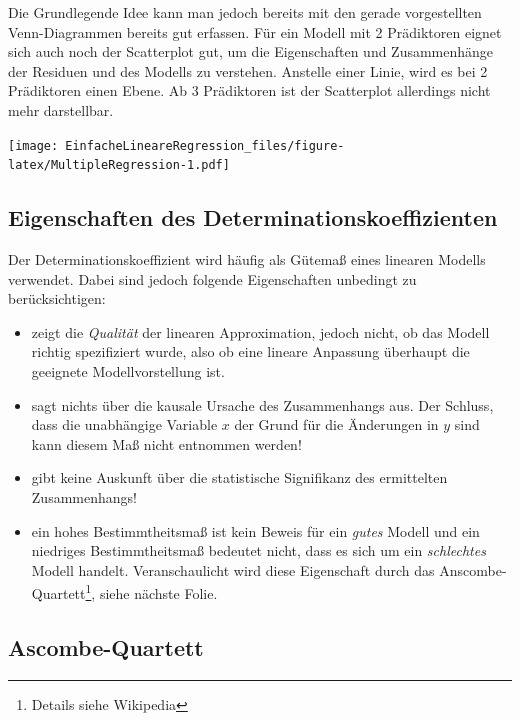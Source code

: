 \documentclass[
]{article}
\providecommand{\tightlist}{%
  \setlength{\itemsep}{0pt}\setlength{\parskip}{0pt}}
\begin{document}
Die Grundlegende Idee kann man jedoch bereits mit den gerade vorgestellten Venn-Diagrammen bereits gut erfassen. Für ein Modell mit 2 Prädiktoren eignet sich auch noch der Scatterplot gut, um die Eigenschaften und Zusammenhänge der Residuen und des Modells zu verstehen. Anstelle einer Linie, wird es bei 2 Prädiktoren einen Ebene. Ab 3 Prädiktoren ist der Scatterplot allerdings nicht mehr darstellbar.

\texttt{[image: EinfacheLineareRegression\_files/figure-latex/MultipleRegression-1.pdf]}

\subsection*{Eigenschaften des Determinationskoeffizienten}\label{eigenschaften-des-determinationskoeffizienten}

Der Determinationskoeffizient wird häufig als Gütemaß eines linearen Modells verwendet. Dabei sind jedoch folgende Eigenschaften unbedingt zu berücksichtigen:

\begin{itemize}
\tightlist
\item
  zeigt die \textit{Qualität} der linearen Approximation, jedoch nicht, ob das Modell richtig spezifiziert wurde, also ob eine lineare Anpassung überhaupt die geeignete Modellvorstellung ist.
\item
  sagt nichts über die kausale Ursache des Zusammenhangs aus. Der Schluss, dass die unabhängige Variable \(x\) der Grund für die Änderungen in \(y\) sind kann diesem Maß nicht entnommen werden!
\item
  gibt keine Auskunft über die statistische Signifikanz des ermittelten Zusammenhangs!
\item
  ein hohes Bestimmtheitsmaß ist kein Beweis für ein \textit{gutes} Modell und ein niedriges Bestimmtheitsmaß bedeutet nicht, dass es sich um ein \textit{schlechtes} Modell handelt. Veranschaulicht wird diese Eigenschaft durch das Anscombe-Quartett\footnote{Details siehe Wikipedia}, siehe nächste Folie.
\end{itemize}

\subsection*{Ascombe-Quartett}\label{ascombe-quartett}
\end{document}
